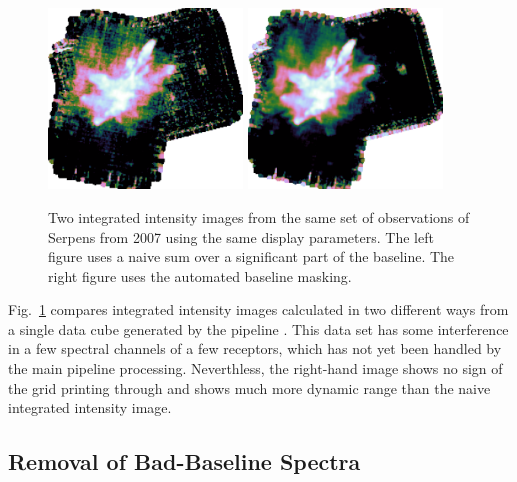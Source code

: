 \documentclass[final,authoryear,5p,times,twocolumn]{elsarticle}
\begin{document}
\begin{figure}[t]
\begin{minipage}{\textwidth}
\centering
\includegraphics[width=0.46\textwidth]{integ_manual.png}
\includegraphics[width=0.46\textwidth]{integ_auto.png}
\caption{Two integrated intensity images from the same set of
  observations of Serpens from 2007 using the same display
  parameters. The left figure uses a naive sum over a significant part
  of the baseline. The right figure uses the automated baseline
  masking.}
\label{fig:integ}
\end{minipage}
\end{figure}

Fig.\ \ref{fig:integ} compares integrated intensity images calculated
in two different ways from a single data cube generated by the
pipeline \citep[see][for details of earlier
reductions of these data]{2010MNRAS.409.1412G,2010A&A...523A..29D}. This data set
has some interference in a few spectral channels of a few receptors,
which has not yet been handled by the main pipeline
processing. Neverthless, the right-hand image shows no sign of the grid
printing through and shows much more dynamic range than the naive
integrated intensity image.

\subsection{Removal of Bad-Baseline Spectra}
\end{document}
